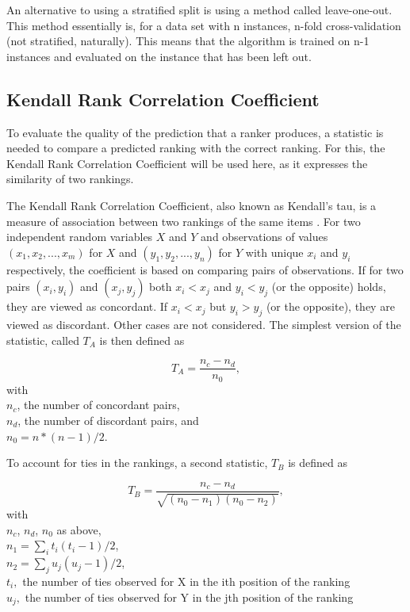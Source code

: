 An alternative to using a stratified split is using a method called leave-one-out. This method essentially is, for a data set with n instances, n-fold cross-validation (not stratified, naturally). This means that the algorithm is trained on n-1 instances and evaluated on the instance that has been left out.

\subsection{Kendall Rank Correlation Coefficient}
To evaluate the quality of the prediction that a ranker produces, a statistic is needed to compare a predicted ranking with the correct ranking. For this, the Kendall Rank Correlation Coefficient will be used here, as it expresses the similarity of two rankings.

The Kendall Rank Correlation Coefficient, also known as Kendall's tau, is a measure of association between two rankings of the same items \cite{kendall1938new}. For two independent random variables $X$ and $Y$ and observations of values $(x_1,x_2,...,x_m)$ for $X$ and $(y_1,y_2,...,y_n)$ for $Y$ with unique $x_i$ and $y_i$ respectively, the coefficient is based on comparing pairs of observations. If for two pairs $(x_i,y_i)$ and $(x_j,y_j)$ both $x_i < x_j$ and $y_i < y_j$ (or the opposite) holds, they are viewed as concordant. If $x_i < x_j$ but $y_i > y_j$ (or the opposite), they are viewed as discordant. Other cases are not considered. The simplest version of the statistic, called $T_A$ is then defined as 

$$T_A = \frac{n_c - n_d}{n_0},$$
with \\
$n_c$, the number of concordant pairs, \\
$n_d$, the number of discordant pairs, and \\
$n_0 = n * (n - 1) / 2$.

To account for ties in the rankings, a second statistic, $T_B$ is defined as

$$T_B = \frac{n_c - n_d}{\sqrt{(n_0 - n_1 )(n_0 - n_2 )}},$$
with \\
$n_c$, $n_d$, $n_0$ as above, \\
$n_1=\sum_i{t_i(t_i-1)/2}$, \\
$n_2=\sum_j{u_j(u_j-1)/2}$, \\
$t_i,$ the number of ties observed for X in the ith position of the ranking \\
$u_j,$ the number of ties observed for Y in the jth position of the ranking 

